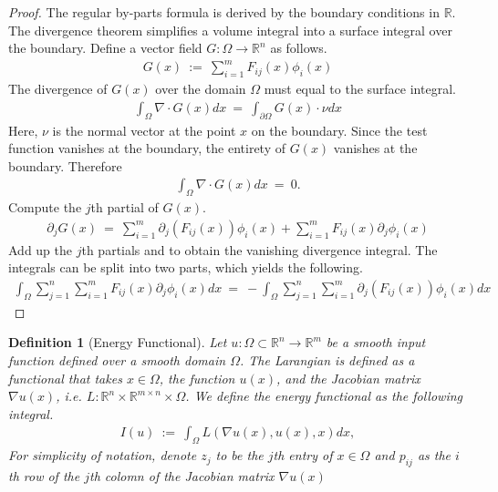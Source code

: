 \documentclass[10pt]{article}
\numberwithin{equation}{section}
\newtheorem{definition}{Definition}
\numberwithin{theorem}{section}
\numberwithin{proposition}{section}
\numberwithin{lemma}{section}
\numberwithin{corollary}{section}
\numberwithin{remark}{section}
\numberwithin{definition}{section}
\numberwithin{example}{section}
\numberwithin{conjecture}{section}
\numberwithin{question}{section}
\begin{document}
\begin{proof}
    The regular by-parts formula is derived by the boundary conditions 
    in $\mathbb R$. The divergence theorem simplifies a volume integral 
    into a surface integral over the boundary. 
    Define a vector field $G:\Omega \rightarrow \mathbb R^n$ as follows. 
    \begin{align}
        G(x) \ := \ \sum_{i = 1}^m F_{ij}(x) \phi_i (x)
    \end{align}
    The divergence of $G(x)$ over the domain $\Omega$ must equal to the surface integral. 
    \begin{align}
        \int_{\Omega}\nabla \cdot G(x) dx \ = \ \int_{\partial \Omega} G(x) \cdot \nu dx
    \end{align}
    Here, $\nu$ is the normal vector at the point $x$ on the boundary. Since 
    the test function vanishes at the boundary, the entirety of $G(x)$ vanishes 
    at the boundary. Therefore
    \begin{align}
        \int_{\Omega} \nabla \cdot G(x) dx \ = \ 0.
    \end{align}
    Compute the $j$th partial of $G(x)$. 
    \begin{align}
        \partial_j G(x) \ = \ \sum_{i = 1}^m \partial_j\left(F_{ij}(x)\right)\phi_i(x) + \sum_{i = 1}^m F_{ij}(x) \partial_j \phi_i(x) 
    \end{align}
    Add up the $j$th partials and to obtain the vanishing divergence integral. 
    The integrals can be split into two parts, which yields the following. 
    \begin{align}
        \int_{\Omega} \sum_{j = 1}^n \sum_{i = 1}^m F_{ij}(x) \partial_j \phi_i (x)dx 
 \ = \ -
 \int_{\Omega} \sum_{j = 1}^n \sum_{i = 1}^m \partial_j (F_{ij}(x)) \phi_i(x)dx
    \end{align}
\end{proof}


\begin{definition}[Energy Functional]
    Let $u:\Omega \subset \mathbb R^n \rightarrow \mathbb R^m$ be a 
    smooth input function defined over a smooth domain $\Omega$. The Larangian 
    is defined as a functional that takes $x \in \Omega$, the function 
    $u(x)$, and the Jacobian matrix $\nabla u(x)$, i.e. $L:\mathbb R^n 
    \times \mathbb R^{m \times n} \times \Omega$. We define the energy functional 
    as the following integral. 
    \begin{align}
        I(u) \ := \ 
        \int_{\Omega} L(\nabla u(x), u(x), x) dx,
    \end{align}
    For simplicity of notation, denote $z_j$ to be the $j$th entry 
    of $x \in \Omega$ and $p_{ij}$ as the $i$th row of the $j$th colomn 
    of the Jacobian matrix $\nabla u(x)$
\end{definition}
\end{document}
